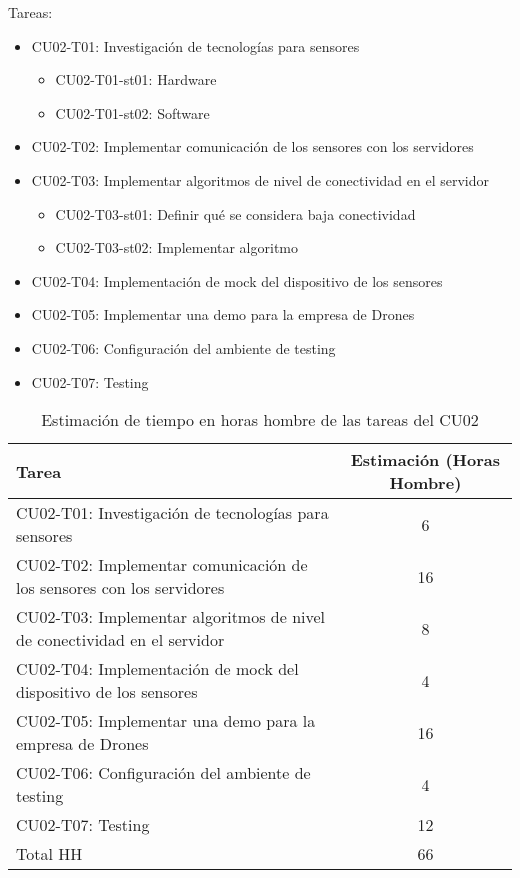 Tareas: 
\begin{itemize}

\item CU02-T01: Investigación de tecnologías para sensores
\begin{itemize}
\item CU02-T01-st01: Hardware
\item CU02-T01-st02: Software
\end{itemize}

\item CU02-T02: Implementar comunicación de los sensores con los servidores

\item CU02-T03: Implementar algoritmos de nivel de conectividad en el servidor 
\begin{itemize}
\item CU02-T03-st01: Definir qué se considera baja conectividad
\item CU02-T03-st02: Implementar algoritmo
\end{itemize}

\item CU02-T04: Implementación de mock del dispositivo de los sensores
\item CU02-T05: Implementar una demo para la empresa de Drones
\item CU02-T06: Configuración del ambiente de testing
\item CU02-T07: Testing

\end{itemize}

\begin{table}[htb]
\begin{center}
\begin{tabular}{|l|c|}
\hline
Tarea & Estimación (Horas Hombre) \\
\hline \hline
CU02-T01: Investigación de tecnologías para sensores & 6 \\ \hline
CU02-T02: Implementar comunicación de los sensores con los servidores & 16 \\ \hline
CU02-T03: Implementar algoritmos de nivel de conectividad en el servidor & 8 \\ \hline
CU02-T04: Implementación de mock del dispositivo de los sensores & 4 \\ \hline
CU02-T05: Implementar una demo para la empresa de Drones & 16 \\ \hline
CU02-T06: Configuración del ambiente de testing & 4 \\ \hline
CU02-T07: Testing & 12 \\ \hline
Total HH & 66 \\ \hline
\end{tabular}
\caption{Estimación de tiempo en horas hombre de las tareas del CU02}
\label{tabla:sencilla}
\end{center}
\end{table}

